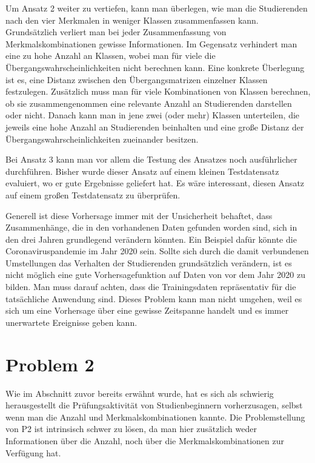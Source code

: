 Um Ansatz 2 weiter zu vertiefen, kann man \"uberlegen, wie man die Studierenden nach den vier Merkmalen in weniger Klassen zusammenfassen kann. Grunds\"atzlich verliert man bei
jeder Zusammenfassung von Merkmalskombinationen gewisse Informationen. Im Gegensatz verhindert man eine zu hohe Anzahl an Klassen, wobei man f\"ur viele die \"Ubergangswahrscheinlichkeiten
nicht berechnen kann. Eine konkrete \"Uberlegung ist es, eine Distanz zwischen den \"Ubergangsmatrizen einzelner Klassen festzulegen. Zus\"atzlich muss man f\"ur viele
Kombinationen von Klassen berechnen, ob sie zusammengenommen eine relevante Anzahl an Studierenden darstellen oder nicht. Danach kann man in jene zwei (oder mehr) Klassen
unterteilen, die jeweils eine hohe Anzahl an Studierenden beinhalten und eine gro{\ss}e Distanz der \"Ubergangswahrscheinlichkeiten zueinander besitzen.

Bei Ansatz 3 kann man vor allem die Testung des Ansatzes noch ausf\"uhrlicher durchf\"uhren. Bisher wurde dieser Ansatz auf einem kleinen Testdatensatz evaluiert, wo er
gute Ergebnisse geliefert hat. Es w\"are interessant, diesen Ansatz auf einem gro{\ss}en Testdatensatz zu \"uberpr\"ufen.

Generell ist diese Vorhersage immer mit der Unsicherheit behaftet, dass Zusammenh\"ange, die in den vorhandenen Daten
gefunden worden sind, sich in den drei Jahren grundlegend ver\"andern k\"onnten. Ein Beispiel daf\"ur k\"onnte die Coronaviruspandemie im Jahr 2020 sein. Sollte sich
durch die damit verbundenen Umstellungen das Verhalten der Studierenden grunds\"atzlich ver\"andern, ist es nicht m\"oglich eine gute Vorhersagefunktion auf Daten von
vor dem Jahr 2020 zu bilden. Man muss darauf achten, dass die Trainingsdaten repr\"asentativ f\"ur die tats\"achliche Anwendung sind. Dieses Problem kann man nicht umgehen,
weil es sich um eine Vorhersage \"uber eine gewisse Zeitspanne handelt und es immer unerwartete Ereignisse geben kann.






\section{Problem 2}

Wie im Abschnitt zuvor bereits erw\"ahnt wurde, hat es sich als schwierig herausgestellt die Pr\"ufungsaktivit\"at von Studienbeginnern vorherzusagen, selbst
wenn man die Anzahl und Merkmalskombinationen kannte. Die Problemstellung von P2 ist intrinsisch schwer zu l\"osen, da man hier zus\"atzlich weder Informationen \"uber die Anzahl, noch \"uber die
Merkmalskombinationen zur Verf\"ugung hat.

